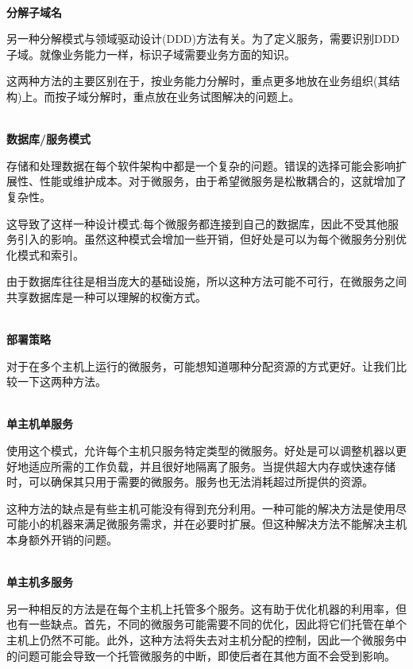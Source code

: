 \hspace*{\fill} \\ %
\noindent
\textbf{分解子域名}

另一种分解模式与领域驱动设计(DDD)方法有关。为了定义服务，需要识别DDD子域。就像业务能力一样，标识子域需要业务方面的知识。

这两种方法的主要区别在于，按业务能力分解时，重点更多地放在业务组织(其结构)上。而按子域分解时，重点放在业务试图解决的问题上。

\hspace*{\fill} \\ %
\noindent
\textbf{数据库/服务模式}

存储和处理数据在每个软件架构中都是一个复杂的问题。错误的选择可能会影响扩展性、性能或维护成本。对于微服务，由于希望微服务是松散耦合的，这就增加了复杂性。

这导致了这样一种设计模式:每个微服务都连接到自己的数据库，因此不受其他服务引入的影响。虽然这种模式会增加一些开销，但好处是可以为每个微服务分别优化模式和索引。

由于数据库往往是相当庞大的基础设施，所以这种方法可能不可行，在微服务之间共享数据库是一种可以理解的权衡方式。

\hspace*{\fill} \\ %
\noindent
\textbf{部署策略}

对于在多个主机上运行的微服务，可能想知道哪种分配资源的方式更好。让我们比较一下这两种方法。

\hspace*{\fill} \\ %
\noindent
\textbf{单主机单服务}

使用这个模式，允许每个主机只服务特定类型的微服务。好处是可以调整机器以更好地适应所需的工作负载，并且很好地隔离了服务。当提供超大内存或快速存储时，可以确保其只用于需要的微服务。服务也无法消耗超过所提供的资源。

这种方法的缺点是有些主机可能没有得到充分利用。一种可能的解决方法是使用尽可能小的机器来满足微服务需求，并在必要时扩展。但这种解决方法不能解决主机本身额外开销的问题。

\hspace*{\fill} \\ %
\noindent
\textbf{单主机多服务}

另一种相反的方法是在每个主机上托管多个服务。这有助于优化机器的利用率，但也有一些缺点。首先，不同的微服务可能需要不同的优化，因此将它们托管在单个主机上仍然不可能。此外，这种方法将失去对主机分配的控制，因此一个微服务中的问题可能会导致一个托管微服务的中断，即使后者在其他方面不会受到影响。

